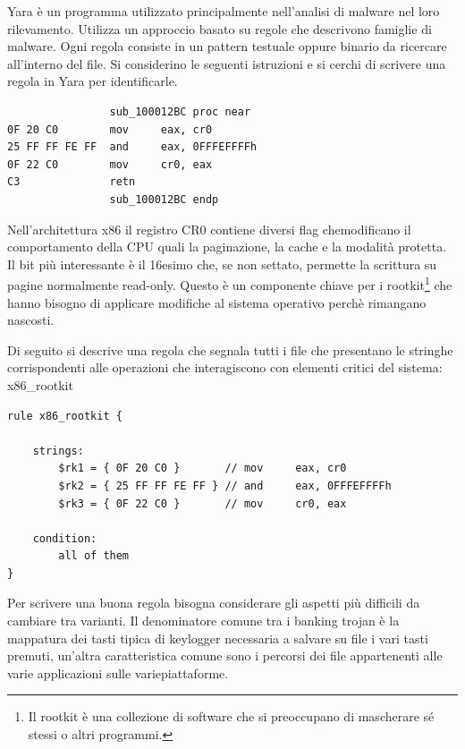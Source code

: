 \documentclass[12pt,oneside]{fithesis2}
\begin{document}
        Yara è un programma utilizzato principalmente nell'analisi di \newline malware nel loro rilevamento. Utilizza un approccio basato su regole che descrivono famiglie di malware. Ogni regola consiste in un pattern testuale oppure binario da ricercare all'interno del file.\newline
        Si considerino le seguenti istruzioni e si cerchi di scrivere una regola in Yara per identificarle.
        
        \begin{verbatim}
                sub_100012BC proc near
0F 20 C0        mov     eax, cr0
25 FF FF FE FF  and     eax, 0FFFEFFFFh
0F 22 C0        mov     cr0, eax
C3              retn
                sub_100012BC endp
        \end{verbatim}
        
        Nell'architettura x86 il registro CR0 contiene diversi flag che\newline modificano il comportamento della CPU quali la paginazione, la cache e la modalità protetta. Il bit più interessante è il 16esimo che, se non settato, permette la scrittura su pagine normalmente read-only. Questo è un componente chiave per i rootkit\footnote{Il rootkit è una collezione di software che si preoccupano di mascherare sé stessi o altri programmi.} che hanno bisogno di applicare modifiche al sistema operativo perchè rimangano nascosti.
        
        Di seguito si descrive una regola che segnala tutti i file che presentano le stringhe corrispondenti alle operazioni che interagiscono con elementi critici del sistema: x86\_rootkit
        
        \begin{verbatim}
rule x86_rootkit {

    strings:
        $rk1 = { 0F 20 C0 }       // mov     eax, cr0
        $rk2 = { 25 FF FF FE FF } // and     eax, 0FFFEFFFFh
        $rk3 = { 0F 22 C0 }       // mov     cr0, eax
        
    condition:
        all of them
}
        \end{verbatim}
        Per scrivere una buona regola bisogna considerare gli aspetti più difficili da cambiare tra varianti. Il denominatore comune tra i banking trojan è la mappatura dei tasti tipica di keylogger necessaria a salvare su file i vari tasti premuti, un'altra caratteristica comune sono i percorsi dei file appartenenti alle varie applicazioni sulle varie\newline piattaforme.
        
\end{document}

